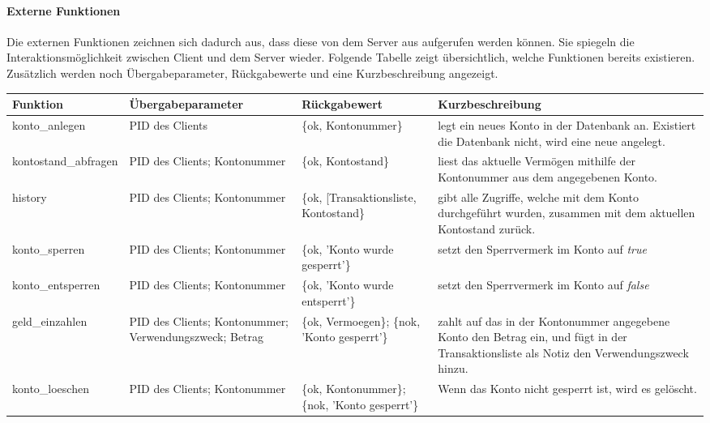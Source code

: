 \paragraph{Externe Funktionen}
Die externen Funktionen zeichnen sich dadurch aus, dass diese von dem Server aus aufgerufen werden können. Sie spiegeln die Interaktionsmöglichkeit zwischen Client und dem Server wieder. Folgende Tabelle zeigt übersichtlich, welche Funktionen bereits existieren. Zusätzlich werden noch Übergabeparameter, Rückgabewerte und eine Kurzbeschreibung angezeigt.
\\
\begin{center}
\begin{tabular}{p{3 cm}|p{3 cm}|p{3 cm}|p{5 cm}}
Funktion & Übergabeparameter & Rückgabewert & Kurzbeschreibung \\
				\hline
				\hline
konto\_anlegen & 
PID des Clients & 
\{ok, Kontonummer\} & 
legt ein neues Konto in der Datenbank an. Existiert die Datenbank nicht, wird eine neue angelegt.\\ \hline

kontostand\_abfragen & 
PID des Clients; Kontonummer & 
\{ok, Kontostand\} & 
liest das aktuelle Vermögen mithilfe der Kontonummer aus dem angegebenen Konto.\\ \hline

history & 
PID des Clients; Kontonummer & 
\{ok, [Transaktionsliste, Kontostand\} & 
gibt alle Zugriffe, welche mit dem Konto durchgeführt wurden, zusammen mit dem aktuellen Kontostand zurück.\\ \hline

konto\_sperren & 
PID des Clients; Kontonummer & 
\{ok, 'Konto wurde gesperrt'\} & 
setzt den Sperrvermerk im Konto auf \textit{true}\\ \hline

konto\_entsperren & 
PID des Clients; Kontonummer & 
\{ok, 'Konto wurde entsperrt'\} & 
setzt den Sperrvermerk im Konto auf \textit{false}\\ \hline

geld\_einzahlen & 
PID des Clients; Kontonummer; Verwendungszweck; Betrag & 
\{ok, Vermoegen\}; \{nok, 'Konto gesperrt'\} & 
zahlt auf das in der Kontonummer angegebene Konto den Betrag ein, und fügt in der Transaktionsliste als Notiz den Verwendungszweck hinzu.\\ \hline

konto\_loeschen & 
PID des Clients; Kontonummer & 
\{ok, Kontonummer\}; \{nok, 'Konto gesperrt'\} & 
Wenn das Konto nicht gesperrt ist, wird es gelöscht.\\ \hline


\end{tabular}
\end{center}
